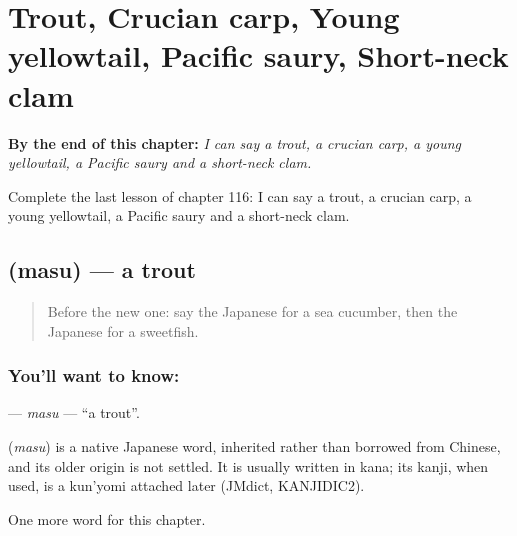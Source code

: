 
\chapter{Trout, Crucian carp, Young yellowtail, Pacific saury, Short-neck clam}
\label{ch:ja-trout-crucian-carp-young-yellowtail-pacific-saury-short-neck-clam}

\begin{chapteropening}
\textbf{By the end of this chapter:} \emph{I can say a trout, a crucian carp, a young yellowtail, a Pacific saury and a short-neck clam.}

Complete the last lesson of chapter 116: I can say a trout, a crucian carp, a young yellowtail, a Pacific saury and a short-neck clam.
\end{chapteropening}

\section[\texorpdfstring{\ja{ます} (masu)}{ます (masu)}]{ (masu) — a trout}

\label{lesson:JA-C116-masu}



\begin{quote}
Before the new one: say the Japanese for a sea cucumber, then the Japanese for a sweetfish.
\end{quote}

\subsection*{You'll want to know: }
\textbf{} — \emph{masu} — \textquotedblleft{}a trout\textquotedblright{}.

\begin{cousinweb}
\textbf{} (\emph{masu}) is a native Japanese word, inherited rather than borrowed from Chinese, and its older origin is not settled. It is usually written in kana; its kanji, when used, is a kun'yomi attached later (JMdict, KANJIDIC2).
\end{cousinweb}

\begin{grammarlens}[title={What you've built}]
One more word for this chapter.
\end{grammarlens}


